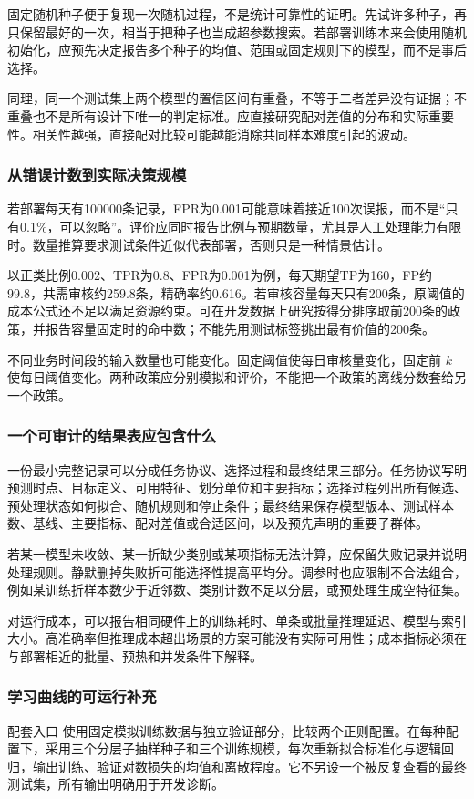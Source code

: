 \documentclass[UTF8,fontset=none,zihao=-4,a4paper]{ctexart}
\newcommand{\code}[1]{\texttt{\detokenize{#1}}}
\numberwithin{equation}{section}
\numberwithin{figure}{section}
\begin{document}
固定随机种子便于复现一次随机过程，不是统计可靠性的证明。先试许多种子，再只保留最好的一次，相当于把种子也当成超参数搜索。若部署训练本来会使用随机初始化，应预先决定报告多个种子的均值、范围或固定规则下的模型，而不是事后选择。

同理，同一个测试集上两个模型的置信区间有重叠，不等于二者差异没有证据；不重叠也不是所有设计下唯一的判定标准。应直接研究配对差值的分布和实际重要性。相关性越强，直接配对比较可能越能消除共同样本难度引起的波动。

\subsubsection{从错误计数到实际决策规模}
若部署每天有100000条记录，FPR为0.001可能意味着接近100次误报，而不是“只有0.1\%，可以忽略”。评价应同时报告比例与预期数量，尤其是人工处理能力有限时。数量推算要求测试条件近似代表部署，否则只是一种情景估计。

以正类比例0.002、TPR为0.8、FPR为0.001为例，每天期望TP为160，FP约99.8，共需审核约259.8条，精确率约0.616。若审核容量每天只有200条，原阈值的成本公式还不足以满足资源约束。可在开发数据上研究按得分排序取前200条的政策，并报告容量固定时的命中数；不能先用测试标签挑出最有价值的200条。

不同业务时间段的输入数量也可能变化。固定阈值使每日审核量变化，固定前 $k$ 使每日阈值变化。两种政策应分别模拟和评价，不能把一个政策的离线分数套给另一个政策。

\subsubsection{一个可审计的结果表应包含什么}
一份最小完整记录可以分成任务协议、选择过程和最终结果三部分。任务协议写明预测时点、目标定义、可用特征、划分单位和主要指标；选择过程列出所有候选、预处理状态如何拟合、随机规则和停止条件；最终结果保存模型版本、测试样本数、基线、主要指标、配对差值或合适区间，以及预先声明的重要子群体。

若某一模型未收敛、某一折缺少类别或某项指标无法计算，应保留失败记录并说明处理规则。静默删掉失败折可能选择性提高平均分。调参时也应限制不合法组合，例如某训练折样本数少于近邻数、类别计数不足以分层，或预处理生成空特征集。

对运行成本，可以报告相同硬件上的训练耗时、单条或批量推理延迟、模型与索引大小。高准确率但推理成本超出场景的方案可能没有实际可用性；成本指标必须在与部署相近的批量、预热和并发条件下解释。

\subsubsection{学习曲线的可运行补充}
配套入口 \code{ch14_learning_curves.py} 使用固定模拟训练数据与独立验证部分，比较两个正则配置。在每种配置下，采用三个分层子抽样种子和三个训练规模，每次重新拟合标准化与逻辑回归，输出训练、验证对数损失的均值和离散程度。它不另设一个被反复查看的最终测试集，所有输出明确用于开发诊断。
\end{document}
